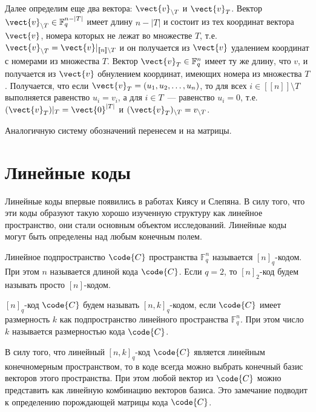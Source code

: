 \documentclass{cmcmsuthesis-phd}
\begin{document}
Далее определим еще два вектора: \(\vect{v}_{\setminus T}\) и \(\vect{v}_{T}\).
Вектор \(\vect{v}_{\setminus T}\in \mathbb{F}_{q}^{n-|T|}\) имеет длину \(n-|T|\) и состоит из тех координат вектора \(\vect{v}\), номера которых не лежат во множестве \(T\), т.е. \(\vect{v}_{\setminus T}=\vect{v}\vert_{[\![n]\!]\setminus T}\) и он получается из \(\vect{v}\) удалением координат с номерами из множества \(T\).
Вектор \(\vect{v}_{T}\in\mathbb{F}_{q}^{n}\) имеет ту же длину, что \(v\), и получается из \(\vect{v}\) обнулением координат, имеющих номера из множества \(T\).
Получается, что если \(\vect{v}_{T}= \left(u_{1}, u_{2}, \dotsc, u_{n}\right)\), то для всех \(i\in [\![n]\!]\setminus T\) выполняется равенство \(u_{i}=v_{i}\), а для \(i\in T\)~--- равенство \(u_{i}=0\), т.е. \((\vect{v}_{T})\vert_{T}=\vect{0}^{|T|}\) и \((\vect{v}_{T})_{\setminus T}=v_{\setminus T}\).

Аналогичную систему обозначений перенесем и на матрицы.
\section{Линейные коды}
\label{sec:org2c6f0ec}
Линейные коды впервые появились в работах Киясу и Слепяна.
В силу того, что эти коды образуют такую хорошо изученную структуру как линейное пространство, они стали основным объектом исследований.
Линейные коды могут быть определены над любым конечным полем.

\begin{definition}\label{def:ncode}
Линейное подпространство \(\code{C}\) пространства \(\mathbb{F}^n_q\) называется \([n]_q\)-кодом.
При этом \(n\) называется длиной кода \(\code{C}\).
Если \(q=2\), то \([n]_2\)-код будем называть просто \([n]\)-кодом.
\end{definition}

\begin{definition}\label{def:nkcode}
\([n]_q\)-код \(\code{C}\) будем называть \([n,k]_q\)-кодом, если \(\code{C}\) имеет размерность \(k\) как подпространство линейного пространства \(\mathbb{F}^n_q\).
При этом число \(k\) называется размерностью кода \(\code{C}\).
\end{definition}

В силу того, что линейный \([n,k]_q\)-код \(\code{C}\) является линейным конечномерным пространством, то в коде всегда можно выбрать конечный базис векторов этого пространства.
При этом любой вектор из \(\code{C}\) можно представить как линейную комбинацию векторов базиса.
Это замечание подводит к определению порождающей матрицы кода \(\code{C}\).
\end{document}
